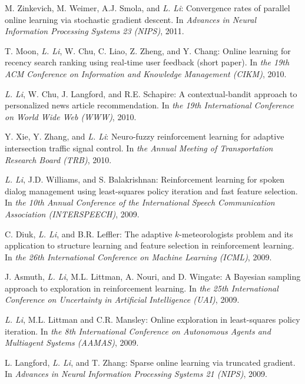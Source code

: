 \documentclass[10pt,twoside,letterpaper]{article}
\newcommand{\selffont}[1]{{\textit{#1}}}
\newcommand{\venuefont}[1]{{\textit{#1}}}
\newcommand{\myself}{\selffont{L. Li}}
\begin{document}
\begin{compactenum}[(C1)]
\item{M. Zinkevich, M. Weimer, A.J. Smola, and \myself: Convergence rates of parallel online learning via stochastic gradient descent.  In \venuefont{Advances in Neural Information Processing Systems 23 (NIPS)}, 2011.}

\item{T. Moon, \myself, W. Chu, C. Liao, Z. Zheng, and Y. Chang:  Online learning for recency search ranking using real-time user feedback (short paper).  In \venuefont{the 19th ACM Conference on Information and Knowledge Management (CIKM)}, 2010.}

\item{\myself, W. Chu, J. Langford, and R.E. Schapire: A contextual-bandit approach to personalized news article recommendation.  In \venuefont{the 19th International Conference on World Wide Web (WWW)}, 2010.}

\item{Y. Xie, Y. Zhang, and \myself: Neuro-fuzzy reinforcement learning for adaptive intersection traffic signal control.  In \venuefont{the Annual Meeting of Transportation Research Board (TRB)}, 2010.}

\item{\myself, J.D. Williams, and S. Balakrishnan:
Reinforcement learning for spoken dialog management using
least-squares policy iteration and fast feature selection. In
\venuefont{the 10th Annual Conference of the International Speech
Communication Association (INTERSPEECH)}, 2009.}

\item{C. Diuk, \myself, and B.R. Leffler: The adaptive
$k$-meteorologists problem and its application to structure
learning and feature selection in reinforcement learning. In
\venuefont{the 26th International Conference on Machine
Learning (ICML)}, 2009.}

\item{J. Asmuth, \myself, M.L. Littman, A. Nouri, and D.
Wingate: A Bayesian sampling approach to exploration in
reinforcement learning.  In \venuefont{the 25th
International Conference on Uncertainty in Artificial Intelligence
(UAI)}, 2009.}

\item{\myself, M.L. Littman and C.R. Mansley: Online
exploration in least-squares policy iteration. In \venuefont{the
8th International Conference on Autonomous Agents and
Multiagent Systems (AAMAS)}, 2009}.

\item{L. Langford, \myself, and T. Zhang: Sparse online
learning via truncated gradient.  In \venuefont{Advances in Neural
Information Processing Systems 21 (NIPS)}, 2009.}


\end{compactenum}
\end{document}
